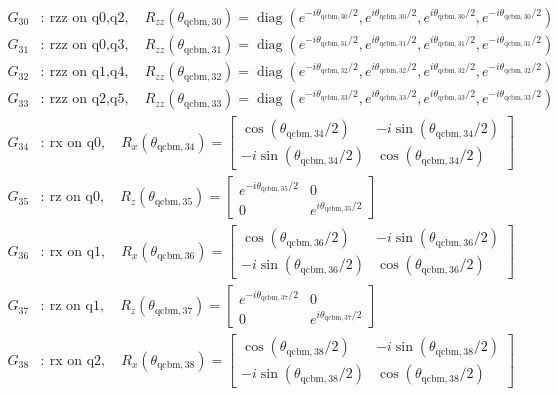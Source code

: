 \begin{align*}
G_{30}&:\ \text{rzz on q0,q2},\quad R_{zz}(\theta_{\mathrm{qcbm},30})=\operatorname{diag}(e^{-i\theta_{\mathrm{qcbm},30}/2},e^{i\theta_{\mathrm{qcbm},30}/2},e^{i\theta_{\mathrm{qcbm},30}/2},e^{-i\theta_{\mathrm{qcbm},30}/2})\\
G_{31}&:\ \text{rzz on q0,q3},\quad R_{zz}(\theta_{\mathrm{qcbm},31})=\operatorname{diag}(e^{-i\theta_{\mathrm{qcbm},31}/2},e^{i\theta_{\mathrm{qcbm},31}/2},e^{i\theta_{\mathrm{qcbm},31}/2},e^{-i\theta_{\mathrm{qcbm},31}/2})\\
G_{32}&:\ \text{rzz on q1,q4},\quad R_{zz}(\theta_{\mathrm{qcbm},32})=\operatorname{diag}(e^{-i\theta_{\mathrm{qcbm},32}/2},e^{i\theta_{\mathrm{qcbm},32}/2},e^{i\theta_{\mathrm{qcbm},32}/2},e^{-i\theta_{\mathrm{qcbm},32}/2})\\
G_{33}&:\ \text{rzz on q2,q5},\quad R_{zz}(\theta_{\mathrm{qcbm},33})=\operatorname{diag}(e^{-i\theta_{\mathrm{qcbm},33}/2},e^{i\theta_{\mathrm{qcbm},33}/2},e^{i\theta_{\mathrm{qcbm},33}/2},e^{-i\theta_{\mathrm{qcbm},33}/2})\\
G_{34}&:\ \text{rx on q0},\quad R_x(\theta_{\mathrm{qcbm},34})=\begin{bmatrix}\cos(\theta_{\mathrm{qcbm},34}/2)&-i\sin(\theta_{\mathrm{qcbm},34}/2)\\-i\sin(\theta_{\mathrm{qcbm},34}/2)&\cos(\theta_{\mathrm{qcbm},34}/2)\end{bmatrix}\\
G_{35}&:\ \text{rz on q0},\quad R_z(\theta_{\mathrm{qcbm},35})=\begin{bmatrix}e^{-i\theta_{\mathrm{qcbm},35}/2}&0\\0&e^{i\theta_{\mathrm{qcbm},35}/2}\end{bmatrix}\\
G_{36}&:\ \text{rx on q1},\quad R_x(\theta_{\mathrm{qcbm},36})=\begin{bmatrix}\cos(\theta_{\mathrm{qcbm},36}/2)&-i\sin(\theta_{\mathrm{qcbm},36}/2)\\-i\sin(\theta_{\mathrm{qcbm},36}/2)&\cos(\theta_{\mathrm{qcbm},36}/2)\end{bmatrix}\\
G_{37}&:\ \text{rz on q1},\quad R_z(\theta_{\mathrm{qcbm},37})=\begin{bmatrix}e^{-i\theta_{\mathrm{qcbm},37}/2}&0\\0&e^{i\theta_{\mathrm{qcbm},37}/2}\end{bmatrix}\\
G_{38}&:\ \text{rx on q2},\quad R_x(\theta_{\mathrm{qcbm},38})=\begin{bmatrix}\cos(\theta_{\mathrm{qcbm},38}/2)&-i\sin(\theta_{\mathrm{qcbm},38}/2)\\-i\sin(\theta_{\mathrm{qcbm},38}/2)&\cos(\theta_{\mathrm{qcbm},38}/2)\end{bmatrix}\\

\end{align*}
